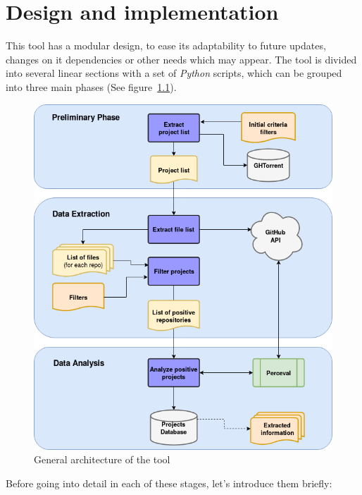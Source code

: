 \documentclass[a4paper, 12pt]{book}
\begin{document}
\chapter{Design and implementation}
\label{sec:arquitectura}
This tool has a modular design, to ease its adaptability to future updates, changes on it dependencies or other needs which may appear.
The tool is divided into several linear sections with a set of \emph{Python} scripts, which can be grouped into three
main phases (See figure~\ref{fig:arquitectura}).
\begin{figure}
  \centering
  \includegraphics[width=12cm, keepaspectratio]{img/generic-tool-diagram-sections}
  \caption{General architecture of the tool}
  \label{fig:arquitectura}
\end{figure}
Before going into detail in each of these stages, let's introduce them briefly:
\end{document}
